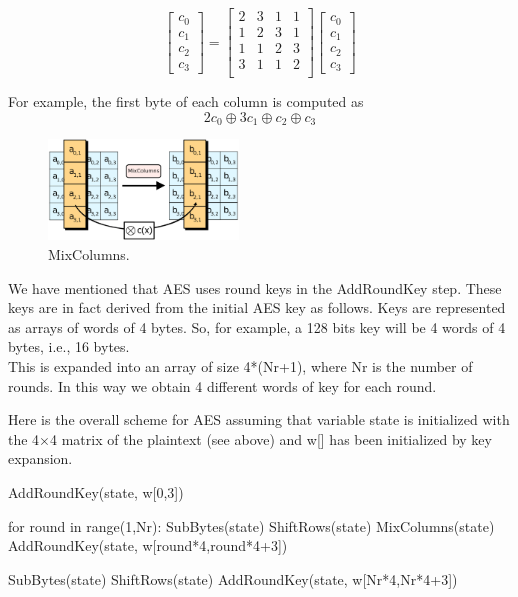 \documentclass[a4paper, 12pt]{report}
\begin{document}
\begin{center}	
	\[ \left[ \begin{array}{c}
	c_0 \\
	c_1 \\
	c_2 \\
	c_3
	\end{array} \right]
	=
	\left[ \begin{array}{cccc}
	2 & 3 & 1 & 1 \\
	1 & 2 & 3 & 1 \\
	1 & 1 & 2 & 3 \\
	3 & 1 & 1 & 2 \\
	\end{array} \right]
	\left[ \begin{array}{c}
	c_0 \\
	c_1 \\
	c_2 \\
	c_3
	\end{array} \right]
	\]
\end{center}
For example, the first byte of each column is computed as \[2c_0\oplus 3c_1\oplus c_2\oplus c_3\]

\begin{figure}
	\includegraphics[width=0.45\textwidth]{images/Lec8/MixColumns.png}
	\caption{MixColumns.}
	\label{fig:mixcolumns}
\end{figure}
We have mentioned that AES uses round keys in the AddRoundKey step. These keys are in fact derived from the initial AES key as follows. Keys are represented as arrays of words of 4 bytes. So, for example, a 128 bits key will be 4 words of 4 bytes, i.e., 16 bytes.\\
This is expanded into an array of size 4*(Nr+1), where Nr is the number of rounds. In this way we obtain 4 different words of key for each round.

Here is the overall scheme for AES assuming that variable state is initialized with the 4$\times$4 matrix of the plaintext (see above) and w[] has been initialized by key expansion.

\begin{python}
	AddRoundKey(state, w[0,3])
	
	for round in range(1,Nr):
		SubBytes(state)
		ShiftRows(state)
		MixColumns(state)
		AddRoundKey(state, w[round*4,round*4+3])
	
	SubBytes(state)
	ShiftRows(state)
	AddRoundKey(state, w[Nr*4,Nr*4+3])
\end{python}
\end{document}
